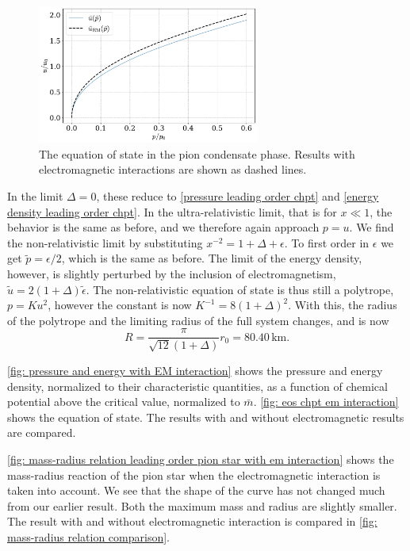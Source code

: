 \begin{figure}[!htb]
    \centering
    \includegraphics[width=0.65\textwidth]{../scripts/figurer/pion_star/pion_eos_EM.pdf}
    \caption{
        The equation of state in the pion condensate phase. 
        Results with electromagnetic interactions are shown as dashed lines.
        }
    \label{fig: eos chpt em interaction}
\end{figure}

In the limit $\Delta = 0$, these reduce to \autoref{pressure leading order chpt} and \autoref{energy density leading order chpt}.
In the ultra-relativistic limit, that is for  $x \ll 1$, the behavior is the same as before, and we therefore again approach $p = u$.
We find the non-relativistic limit by substituting $x^{-2} = 1 + \Delta + \epsilon$.
To first order in $\epsilon$ we get $\tilde p = \epsilon / 2$, which is the same as before.
The limit of the energy density, however, is slightly perturbed by the inclusion of electromagnetism, $\tilde u = 2(1 + \Delta) \tilde \epsilon$.
The non-relativistic equation of state is thus still a polytrope,  $p = K u^2$, however the constant is now $K^{-1} = 8 (1+\Delta)^2$.
With this, the radius of the polytrope and the limiting radius of the full system changes, and is now
%
\begin{equation}
    R = \frac{\pi}{\sqrt{12}(1 + \Delta)} r_0 = 80.40 \, \text{km}.
\end{equation}


\autoref{fig: pressure and energy with EM interaction} shows the pressure and energy density, normalized to their characteristic quantities, as a function of chemical potential above the critical value, normalized to $\bar m$.
\autoref{fig: eos chpt em interaction} shows the equation of state.
The results with and without electromagnetic results are compared.

\autoref{fig: mass-radius relation leading order pion star with em interaction} shows the mass-radius reaction of the pion star when the electromagnetic interaction is taken into account.
We see that the shape of the curve has not changed much from our earlier result. 
Both the maximum mass and radius are slightly smaller.
The result with and without electromagnetic interaction is compared in \autoref{fig: mass-radius relation comparison}.


